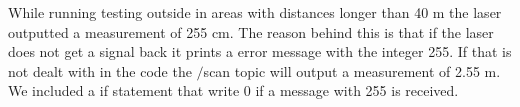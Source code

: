 While running testing outside in areas with distances longer than 40 m the laser outputted a measurement of 255 cm. The reason behind this is that if the laser does not get a signal back it prints a error message with the integer 255. If that is not dealt with in the code the $/$scan topic will output a measurement of 2.55 m. We included a if statement that write 0 if a message with 255 is received. 